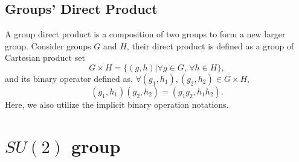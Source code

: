 \documentclass[preprint, 12pt]{revtex4-2}
\numberwithin{equation}{section}
\begin{document}
\subsection{Groups' Direct Product}
A group direct product is a composition of two groups to form a new larger group. Consider groups $G$ and $H$, their direct product is defined as a group of Cartesian product set
\begin{equation}\label{eq:Cartesian product}
    G\times H = \{(g, h)|\forall g\in G,\, \forall h\in H\},
\end{equation}
and its binary operator defined as, $\forall (g_1, h_1), (g_2, h_2)\in G\times H$,
\begin{equation}\label{eq:direct product binary operator}
    (g_1, h_1)(g_2, h_2) = (g_1g_2, h_1h_2).
\end{equation}
Here, we also utilize the implicit binary operation notations.

\section{$SU(2)$ group}
\end{document}
